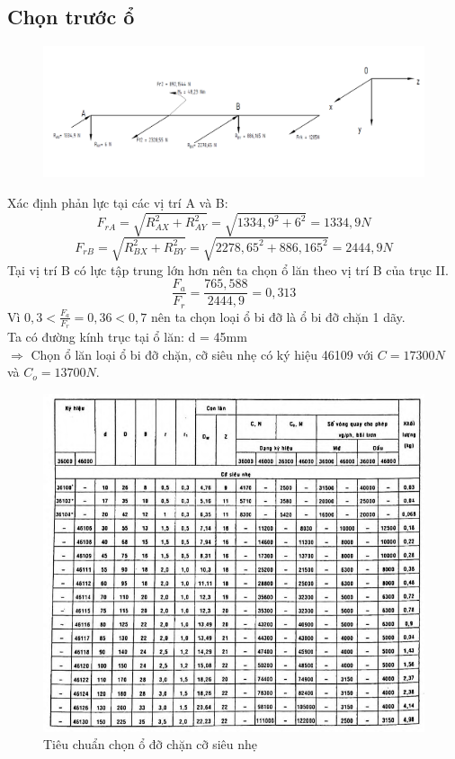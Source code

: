 \subsection{Chọn trước ổ}
\begin{figure}[H]
    \centering
    \includegraphics[width=1\textwidth]{pictures/tinholan2.png}
\end{figure}
Xác định phản lực tại các vị trí A và B:
\[
    F_{rA} = \sqrt{R_{AX}^2 + R_{AY}^2} = \sqrt{1334,9^2 + 6^2} = 1334,9N
\]
\[
    F_{rB} = \sqrt{R_{BX}^2 + R_{BY}^2} = \sqrt{2278,65^2 + 886,165^2} = 2444,9N
\]
Tại vị trí B có lực tập trung lớn hơn nên ta chọn ổ lăn theo vị trí B của trục II.
\[
    \frac{F_a}{F_r} = \frac{765,588}{2444,9} = 0,313
\]
Vì $0,3 < \frac{F_a}{F_r} = 0,36 < 0,7$ nên ta chọn loại ổ bi đỡ là ổ bi đỡ chặn 1 dãy. \\
Ta có đường kính trục tại ổ lăn: d = 45mm \\
$\Rightarrow$ Chọn ổ lăn loại ổ bi đỡ chặn, cỡ siêu nhẹ có ký hiệu 46109 với $C = 17300N$ và $C_o = 13700N$.
\begin{figure}[H]
    \centering
    \includegraphics[width=1\textwidth]{pictures/chono2.png}
    \caption{Tiêu chuẩn chọn ổ đỡ chặn cỡ siêu nhẹ}
\end{figure}
